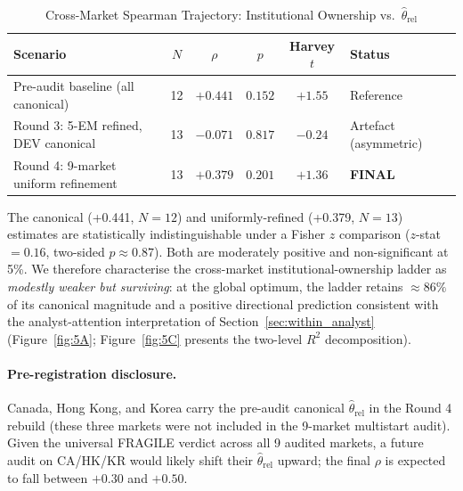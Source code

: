 \documentclass[12pt,a4paper]{article}
\begin{document}
\begin{table}[htbp]
\caption{Cross-Market Spearman Trajectory: Institutional Ownership vs.\ $\hat{\theta}_{\mathrm{rel}}$}
\label{tab:spearman_traj}
\centering
\begin{tabular}{lccccl}
\toprule
Scenario & $N$ & $\rho$ & $p$ & Harvey $t$ & Status \\
\midrule
Pre-audit baseline (all canonical) & 12 & $+0.441$ & $0.152$ & $+1.55$ & Reference \\
Round 3: 5-EM refined, DEV canonical & 13 & $-0.071$ & $0.817$ & $-0.24$ & Artefact (asymmetric) \\
Round 4: 9-market uniform refinement & 13 & $\mathbf{+0.379}$ & $\mathbf{0.201}$ & $\mathbf{+1.36}$ & \textbf{FINAL} \\
\bottomrule
\end{tabular}
\end{table}

The canonical (+0.441, $N=12$) and uniformly-refined (+0.379, $N=13$) estimates are
statistically indistinguishable under a Fisher $z$ comparison
($z$-stat $= 0.16$, two-sided $p \approx 0.87$). Both are moderately positive and
non-significant at 5\%. We therefore characterise the cross-market institutional-ownership
ladder as \emph{modestly weaker but surviving}: at the global optimum, the ladder retains
$\approx 86\%$ of its canonical magnitude and a positive directional prediction consistent
with the analyst-attention interpretation of Section~\ref{sec:within_analyst}
(Figure~\ref{fig:5A}; Figure~\ref{fig:5C} presents the two-level $R^2$ decomposition).

\paragraph{Pre-registration disclosure.}
Canada, Hong Kong, and Korea carry the pre-audit canonical $\hat{\theta}_{\mathrm{rel}}$ in the
Round 4 rebuild (these three markets were not included in the 9-market multistart audit).
Given the universal FRAGILE verdict across all 9 audited markets, a future audit on
CA/HK/KR would likely shift their $\hat{\theta}_{\mathrm{rel}}$ upward; the final
$\rho$ is expected to fall between $+0.30$ and $+0.50$.
\end{document}
